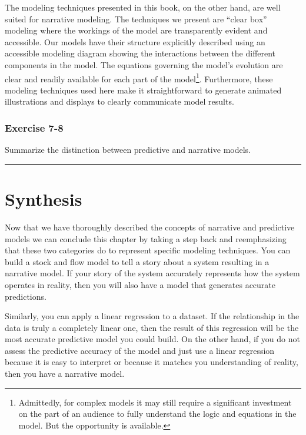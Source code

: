 \documentclass[]{memoir}
\begin{document}
The modeling techniques presented in this book, on the other hand, are
well suited for narrative modeling. The techniques we present are
``clear box'' modeling where the workings of the model are transparently
evident and accessible. Our models have their structure explicitly
described using an accessible modeling diagram showing the interactions
between the different components in the model. The equations governing
the model's evolution are clear and readily available for each part of
the model\footnote{Admittedly, for complex models it may still require a
  significant investment on the part of an audience to fully understand
  the logic and equations in the model. But the opportunity is
  available.}. Furthermore, these modeling techniques used here make it
straightforward to generate animated illustrations and displays to
clearly communicate model results.

\subsubsection{Exercise 7-8}

Summarize the distinction between predictive and narrative models.

\begin{center}\rule{3in}{0.4pt}\end{center}

\section{Synthesis}

Now that we have thoroughly described the concepts of narrative and
predictive models we can conclude this chapter by taking a step back and
reemphasizing that these two categories do to represent specific
modeling techniques. You can build a stock and flow model to tell a
story about a system resulting in a narrative model. If your story of
the system accurately represents how the system operates in reality,
then you will also have a model that generates accurate predictions.

Similarly, you can apply a linear regression to a dataset. If the
relationship in the data is truly a completely linear one, then the
result of this regression will be the most accurate predictive model you
could build. On the other hand, if you do not assess the predictive
accuracy of the model and just use a linear regression because it is
easy to interpret or because it matches you understanding of reality,
then you have a narrative model.
\end{document}
